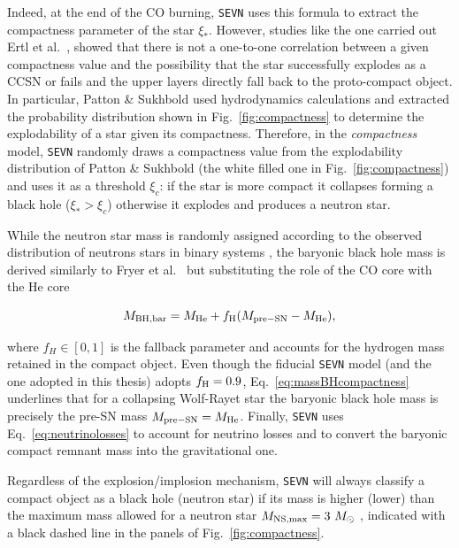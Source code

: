 \documentclass[a4paper,titlepage]{book}     	%
\newcommand{\sun}{\ensuremath{_\odot}}
\newcommand{\msun}{\ensuremath{M\sun}}
\begin{document}
Indeed, at the end of the CO burning, \texttt{SEVN} uses this formula to extract the compactness parameter of the star $\xi_*$. However, studies like the one carried out Ertl et al.\ \cite{Ertl2016}, showed that there is not a one-to-one correlation between a given compactness value and the possibility that the star successfully explodes as a CCSN or fails and the upper layers directly fall back to the proto-compact object. In particular,  Patton \& Sukhbold \cite{COcollapse} used hydrodynamics calculations and extracted the probability distribution shown in Fig.\ \ref{fig:compactness} to determine the explodability of a star given its compactness. Therefore, in the \emph{compactness} model, \texttt{SEVN} randomly draws a compactness value from the explodability distribution of Patton \& Sukhbold (the white filled one in Fig.\ \ref{fig:compactness}) and uses it as a threshold $\xi_c$: if the star is more compact it collapses forming a black hole ($\xi_* > \xi_c$) otherwise it explodes and produces a neutron star.

While the neutron star mass is randomly assigned according to the observed distribution of neutrons stars in binary systems \cite{mapelli2020_compactness}, the baryonic black hole mass is derived similarly to Fryer et al.\ \cite{Fryer2012} but substituting the role of the CO core with the He core

\begin{equation}\label{eq:massBHcompactness}
    M_{\rm BH, bar} = M_{\rm He} + f_{\rm H} (M_{\rm pre-SN}-M_{\rm He}),
\end{equation}

where $f_H \in [0,1]$ is the fallback parameter and accounts for the hydrogen mass retained in the compact object. Even though the fiducial \texttt{SEVN} model (and the one adopted in this thesis) adopts $f_{\rm H} = 0.9$, Eq.\ \ref{eq:massBHcompactness} underlines that for a collapsing Wolf-Rayet star the baryonic black hole mass is precisely the pre-SN mass $M_{\rm pre-SN}=M_{\rm He}$. Finally, \texttt{SEVN} uses Eq.\ \ref{eq:neutrinolosses} to account for neutrino losses and to convert the baryonic compact remnant mass into the gravitational one. 

Regardless of the explosion/implosion mechanism, \texttt{SEVN} will always  classify a compact object as a black hole (neutron star) if its mass is higher (lower) than the maximum mass allowed for a neutron star $M_{\rm NS,max} = 3~\msun$ \cite{NSreview,spera2019_mergingBBH}, indicated with a black dashed line in the panels of Fig.\ \ref{fig:compactness}.
\end{document}
